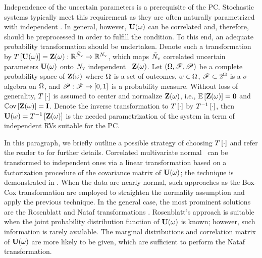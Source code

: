 Independence of the uncertain parameters is a prerequisite of the PC. Stochastic systems typically meet this requirement as they are often naturally parametrized \cite{xiu2010} with independent \rvs. In general, however, $\mathbf{U}(\omega)$ can be correlated and, therefore, should be preprocessed in order to fulfill the condition. To this end, an adequate probability transformation should be undertaken. Denote such a transformation by $T\left[\mathbf{U}(\omega)\right] = \mathbf{Z}(\omega): \mathbb{R}^{\tilde{N}_\text{v}} \to \mathbb{R}^{N_\text{v}}$, which maps ${\tilde{N}_\text{v}}$ correlated uncertain parameters $\mathbf{U}(\omega)$ onto ${N_\text{v}}$ independent \rvs\ $\mathbf{Z}(\omega)$. Let $(\Omega, \mathscr{F}, \mathscr{P})$ be a complete probability space \cite{maitre2010} of $\mathbf{Z}(\omega)$ where $\Omega$ is a set of outcomes, $\omega \in \Omega$, $\mathscr{F} \subset 2^\Omega$ is a $\sigma$-algebra on $\Omega$, and $\mathscr{P}: \mathscr{F} \to [0, 1]$ is a probability measure. Without loss of generality, $T\left[\cdot\right]$ is assumed to center and normalize $\mathbf{Z}(\omega)$, i.e., $\oExp{\vZ(\o)} = \mZero$ and $\oCov{\vZ(\o)} = \mI$. Denote the inverse transformation to $T\left[\cdot\right]$ by $T^{-1}\left[\cdot\right]$, then $\mathbf{U}(\omega) = T^{-1}\left[\mathbf{Z}(\omega)\right]$ is the needed parametrization of the system in term of independent RVs suitable for the PC.

In this paragraph, we briefly outline a possible strategy of choosing $T\left[\cdot\right]$ and refer the reader to \cite{xiu2010, eldred2009} for further details. Correlated multivariate normal \rvs\ can be transformed to independent ones via a linear transformation based on a factorization procedure of the covariance matrix of $\mathbf{U}(\omega)$; the technique is demonstrated in . When the data are nearly normal, such approaches as the Box-Cox transformation are employed to straighten the normality assumption and apply the previous technique. In the general case, the most prominent solutions are the Rosenblatt and Nataf transformations \cite{eldred2009}. Rosenblatt's approach is suitable when the joint probability distribution function of $\mathbf{U}(\omega)$ is known; however, such information is rarely available. The marginal distributions and correlation matrix of $\mathbf{U}(\omega)$ are more likely to be given, which are sufficient to perform the Nataf transformation.

